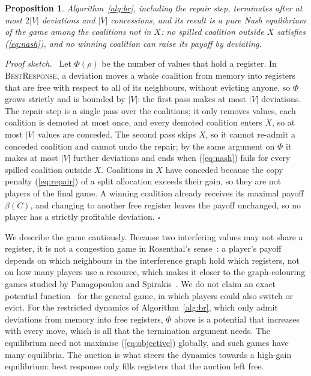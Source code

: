 \documentclass{ieeeaccess}
\newtheorem{proposition}{Proposition}
\newenvironment{proofsketch}{\noindent\textit{Proof sketch.}\ }{\hfill$\square$\par}
\begin{document}
\begin{proposition}
\label{prop:br}
Algorithm~\ref{alg:br}, including the repair step, terminates after at
most $2|V|$ deviations and $|V|$ concessions, and its result is a pure
Nash equilibrium of the game among the coalitions not in $X$: no
spilled coalition outside $X$ satisfies (\ref{eq:nash}), and no winning
coalition can raise its payoff by deviating.
\end{proposition}
\begin{proofsketch}
Let $\Phi(\rho)$ be the number of values that hold a register. In
\textsc{BestResponse}, a deviation moves a whole coalition from memory
into registers that are free with respect to all of its neighbours,
without evicting anyone, so $\Phi$ grows strictly and is bounded by
$|V|$: the first pass makes at most $|V|$ deviations. The repair step
is a single pass over the coalitions; it only removes values, each
coalition is demoted at most once, and every demoted coalition enters
$X$, so at most $|V|$ values are conceded. The second pass skips $X$,
so it cannot re-admit a conceded coalition and cannot undo the repair;
by the same argument on $\Phi$ it makes at most $|V|$ further
deviations and ends when (\ref{eq:nash}) fails for every spilled
coalition outside $X$. Coalitions in $X$ have conceded because the
copy penalty (\ref{eq:repair}) of a split allocation exceeds their
gain, so they are not players of the final game. A winning coalition
already receives its maximal payoff $\beta(C)$, and changing to
another free register leaves the payoff unchanged, so no player has a
strictly profitable deviation.
\end{proofsketch}

We describe the game cautiously. Because two interfering values may not
share a register, it is not a congestion game in Rosenthal's
sense~\cite{rosenthal1973}: a player's payoff depends on which
neighbours in the interference graph hold which registers, not on how
many players use a resource, which makes it closer to the graph-colouring
games studied by Panagopoulou and Spirakis~\cite{panagopoulou2008}. We
do not claim an exact potential function~\cite{monderer1996} for the
general game, in which players could also switch or evict. For the
restricted dynamics of Algorithm~\ref{alg:br}, which only admit
deviations from memory into free registers, $\Phi$ above is a potential
that increases with every move, which is all that the termination
argument needs. The equilibrium need not maximise
(\ref{eq:objective}) globally, and such games have many equilibria. The
auction is what steers the dynamics towards a high-gain equilibrium:
best response only fills registers that the auction left free.
\end{document}
